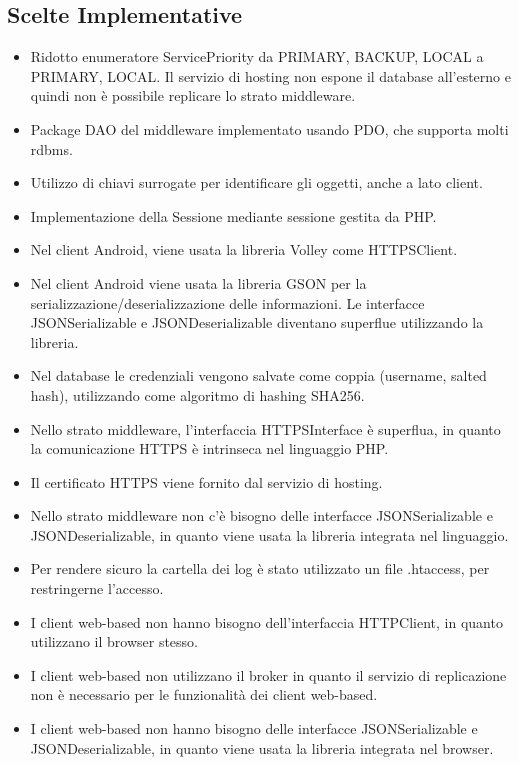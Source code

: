 \documentclass[a4paper]{article}
\begin{document}
\subsection{Scelte Implementative}

\begin{itemize}
    \item Ridotto enumeratore ServicePriority da PRIMARY, BACKUP, LOCAL a PRIMARY, LOCAL. Il servizio di hosting non espone il database all'esterno e quindi non è possibile replicare lo strato middleware.
    \item Package DAO del middleware implementato usando PDO, che supporta molti rdbms.
    \item Utilizzo di chiavi surrogate per identificare gli oggetti, anche a lato client.
    \item Implementazione della Sessione mediante sessione gestita da PHP.
    \item Nel client Android, viene usata la libreria Volley come HTTPSClient.
    \item Nel client Android viene usata la libreria GSON per la serializzazione/deserializzazione delle informazioni. Le interfacce JSONSerializable e JSONDeserializable diventano superflue utilizzando la libreria.
    \item Nel database le credenziali vengono salvate come coppia (username, salted hash), utilizzando come algoritmo di hashing SHA256.
    \item Nello strato middleware, l'interfaccia HTTPSInterface è superflua, in quanto la comunicazione HTTPS è intrinseca nel linguaggio PHP.
    \item Il certificato HTTPS viene fornito dal servizio di hosting.
    \item Nello strato middleware non c'è bisogno delle interfacce JSONSerializable e JSONDeserializable, in quanto viene usata la libreria integrata nel linguaggio.
    \item Per rendere sicuro la cartella dei log è stato utilizzato un file .htaccess, per restringerne l'accesso.
    \item I client web-based non hanno bisogno dell'interfaccia HTTPClient, in quanto utilizzano il browser stesso.
    \item I client web-based non utilizzano il broker in quanto il servizio di replicazione non è necessario per le funzionalità dei client web-based.
    \item I client web-based non hanno bisogno delle interfacce JSONSerializable e JSONDeserializable, in quanto viene usata la libreria integrata nel browser.

\end{itemize}
\end{document}
